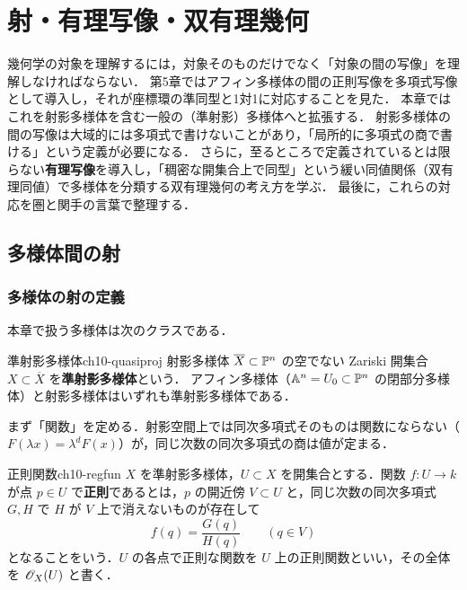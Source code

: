 \chapter{射・有理写像・双有理幾何}
\label{ch:ch10}

\begin{chapterlead}
幾何学の対象を理解するには，対象そのものだけでなく「対象の間の写像」を理解しなければならない．
第5章ではアフィン多様体の間の正則写像を多項式写像として導入し，それが座標環の準同型と1対1に対応することを見た．
本章ではこれを射影多様体を含む一般の（準射影）多様体へと拡張する．
射影多様体の間の写像は大域的には多項式で書けないことがあり，「局所的に多項式の商で書ける」という定義が必要になる．
さらに，至るところで定義されているとは限らない\textbf{有理写像}を導入し，「稠密な開集合上で同型」という緩い同値関係（双有理同値）で多様体を分類する双有理幾何の考え方を学ぶ．
最後に，これらの対応を圏と関手の言葉で整理する．
\end{chapterlead}

\section{多様体間の射}

\subsection{多様体の射の定義}

本章で扱う多様体は次のクラスである．

\begin{mydef}{準射影多様体}{ch10-quasiproj}
射影多様体 $\overline X\subset\mathbb{P}^n$ の空でない Zariski 開集合 $X\subset\overline X$ を\textbf{準射影多様体}という．
アフィン多様体（$\mathbb{A}^n=U_0\subset\mathbb{P}^n$ の閉部分多様体）と射影多様体はいずれも準射影多様体である．
\end{mydef}

まず「関数」を定める．射影空間上では同次多項式そのものは関数にならない（$F(\lambda x)=\lambda^dF(x)$）が，同じ次数の同次多項式の商は値が定まる．

\begin{mydef}{正則関数}{ch10-regfun}
$X$ を準射影多様体，$U\subset X$ を開集合とする．関数 $f:U\to k$ が点 $p\in U$ で\textbf{正則}であるとは，$p$ の開近傍 $V\subset U$ と，同じ次数の同次多項式 $G,H$ で $H$ が $V$ 上で消えないものが存在して
\[
  f(q)=\frac{G(q)}{H(q)}\qquad(q\in V)
\]
となることをいう．$U$ の各点で正則な関数を $U$ 上の正則関数といい，その全体を $\mathscr{O}_X(U)$ と書く．
\end{mydef}

